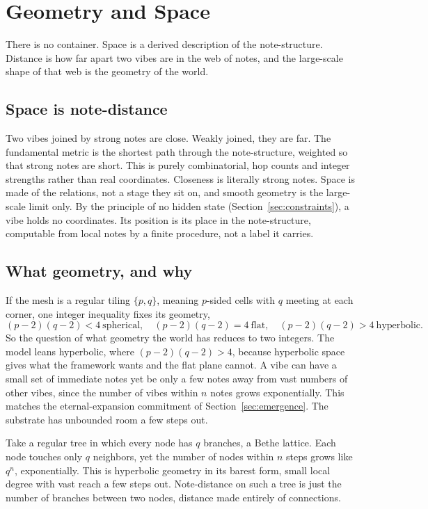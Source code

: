 \section{Geometry and Space}
\label{sec:geometry}

There is no container. Space is a derived description of the note-structure. Distance is how far apart two vibes are in the web of notes, and the large-scale shape of that web is the geometry of the world.

\subsection{Space is note-distance}

Two vibes joined by strong notes are close. Weakly joined, they are far. The fundamental metric is the shortest path through the note-structure, weighted so that strong notes are short. This is purely combinatorial, hop counts and integer strengths rather than real coordinates. Closeness is literally strong notes. Space is made of the relations, not a stage they sit on, and smooth geometry is the large-scale limit only. By the principle of no hidden state (Section~\ref{sec:constraints}), a vibe holds no coordinates. Its position is its place in the note-structure, computable from local notes by a finite procedure, not a label it carries.

\subsection{What geometry, and why}

If the mesh is a regular tiling $\{p, q\}$, meaning $p$-sided cells with $q$ meeting at each corner, one integer inequality fixes its geometry,
\[
(p-2)(q-2) < 4 \ \text{spherical}, \quad (p-2)(q-2) = 4 \ \text{flat}, \quad (p-2)(q-2) > 4 \ \text{hyperbolic}.
\]
So the question of what geometry the world has reduces to two integers. The model leans hyperbolic, where $(p-2)(q-2) > 4$, because hyperbolic space gives what the framework wants and the flat plane cannot. A vibe can have a small set of immediate notes yet be only a few notes away from vast numbers of other vibes, since the number of vibes within $n$ notes grows exponentially. This matches the eternal-expansion commitment of Section~\ref{sec:emergence}. The substrate has unbounded room a few steps out.

\begin{proposition}
Take a regular tree in which every node has $q$ branches, a Bethe lattice. Each node touches only $q$ neighbors, yet the number of nodes within $n$ steps grows like $q^n$, exponentially. This is hyperbolic geometry in its barest form, small local degree with vast reach a few steps out. Note-distance on such a tree is just the number of branches between two nodes, distance made entirely of connections.
\end{proposition}


